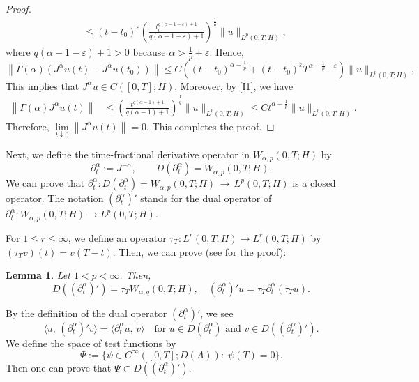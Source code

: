 \documentclass[reqno]{amsart}
\newtheorem{lem}[theorem]{Lemma}
\numberwithin{equation}{section}
\begin{document}
\begin{proof}
\begin{align*}
& \leq\left(t-t_0\right)^{\varepsilon}\left(\frac{t_0^{q(\alpha-1-\varepsilon)+1}}{q(\alpha-1-\varepsilon)+1}\right)^{\frac{1}{q}}\|u\|_{L^p(0, T; H)},
\end{align*}
where $q(\alpha-1-\varepsilon)+1>0$ because $\alpha>\frac{1}{p}+\varepsilon$. Hence,
$$
\left\|\Gamma(\alpha)\left(J^\alpha u(t)-J^\alpha u\left(t_0\right)\right)\right\| \leq C\left(\left(t-t_0\right)^{\alpha-\frac{1}{p}}+\left(t-t_0\right)^{\varepsilon} T^{\alpha-\frac{1}{p}-\varepsilon}\right)\|u\|_{L^p(0, T ; H)},
$$
This implies that $J^\alpha u \in C([0, T] ; H)$.
Moreover, by \eqref{I1}, we have
\begin{align*}
\left\|\Gamma(\alpha) J^\alpha u(t)\right\| & \leq \left(\frac{t^{q(\alpha-1)+1}}{q(\alpha-1)+1}\right)^{\frac{1}{q}} \|u\|_{L^p(0, T ; H)} \leq C t^{\alpha-\frac{1}{p}}\|u\|_{L^p(0, T ; H)}.
\end{align*}
Therefore, $\lim\limits_{t \downarrow 0}\left\|J^\alpha u(t)\right\|=0$. This completes the proof.
\end{proof}

Next, we define the time-fractional derivative operator in $W_{\alpha,p}(0,T;H)$ by 
\begin{equation}\label{deffd}
\partial_t^\alpha := J^{-\alpha}, \qquad D(\partial_t^\alpha) = W_{\alpha,p}(0,T;H).
\end{equation}
We can prove that $\partial_t^\alpha : D(\partial_t^\alpha) = W_{\alpha,p}(0,T;H)\, \rightarrow
\, L^p(0,T;H)$ is a closed operator. The notation $(\partial_t^\alpha)'$ stands for the dual operator of $\partial_t^\alpha : W_{\alpha,p}(0,T;H) \rightarrow L^p(0,T;H)$.

For $1 \le r \le \infty$, we define an operator $\tau_T: L^r(0,T;H) \rightarrow L^r(0,T;H)$ by 
$(\tau_T v)(t) = v(T-t)$.
Then, we can prove (see \cite{Ya18} for the proof):
\begin{lem}
Let $1 < p < \infty$. Then, 
$$
D((\partial_t^\alpha)') = \tau_T W_{\alpha,q}(0,T;H), \quad
(\partial_t^\alpha)'u = \tau_T\partial_t^\alpha (\tau_T u).
$$
\end{lem}
By the definition of the dual operator $(\partial_t^\alpha)'$, we see
$$
\langle u, \, (\partial_t^\alpha)'v \rangle 
= \langle \partial_t^\alpha u,\, v \rangle \quad \mbox{for } u\in D(\partial_t^\alpha) 
\mbox{ and }v \in D((\partial_t^\alpha)').
$$
We define the space of test functions by
$$
\Psi:= \{ \psi\in C^{\infty}([0,T]; D(A))\colon \; 
\psi(T) = 0  \}.
$$
Then one can prove that $\Psi \subset D((\partial_t^\alpha)').$
\end{document}
